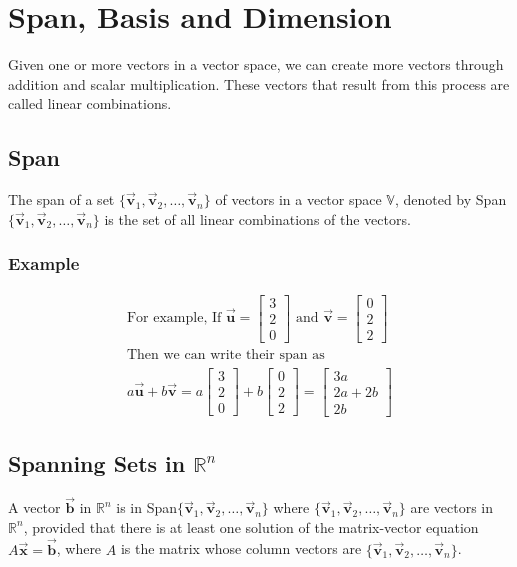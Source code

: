 \documentclass[12pt, landscape, twocolumn]{article}
\let\oldvec\vec
\renewcommand{\vec}[1]{\oldvec{\mathbf{ #1 } } }                    %
\begin{document}
\section{Span, Basis and Dimension}
Given one or more vectors in a vector space, we can create more vectors through addition and scalar multiplication. These vectors that result from this process are called linear combinations.

    \subsection{Span}
    The span of a set $\{\vec{v}_1, \vec{v}_2, \ldots, \vec{v}_n\}$ of vectors in a vector space $\mathbb{V}$, denoted by Span$\{\vec{v}_1, \vec{v}_2, \ldots, \vec{v}_n\}$ is the set of all linear combinations of the vectors.

        \subsubsection{Example}
    \[
        \begin{aligned}
            \text{For example, If } \vec{u} = \left[ \begin{array}{c} 3\\2\\0 \end{array} \right] \text{ and } \vec{v} = \left[ \begin{array}{c} 0\\2\\2 \end{array} \right]\\
            \text{Then we can write their span as }\\
            a\vec{u} + b\vec{v} = a\left[ \begin{array}{c} 3\\2\\0 \end{array} \right] + b\left[ \begin{array}{c} 0\\2\\2 \end{array} \right] = \left[ \begin{array}{c} 3a\\2a+2b\\2b \end{array} \right]
        \end{aligned}
    \]

    \subsection{Spanning Sets in $\mathbb{R}^n$}
    A vector $\vec{b}$ in $\mathbb{R}^n$ is in Span$\{\vec{v}_1, \vec{v}_2, \ldots, \vec{v}_n\}$ where $\{\vec{v}_1, \vec{v}_2, \ldots, \vec{v}_n\}$ are vectors in $\mathbb{R}^n$, provided that there is at least one solution of the matrix-vector equation $A\vec{x} = \vec{b}$, where $A$ is the matrix whose column vectors are $\{\vec{v}_1, \vec{v}_2, \ldots, \vec{v}_n\}$.
\end{document}
